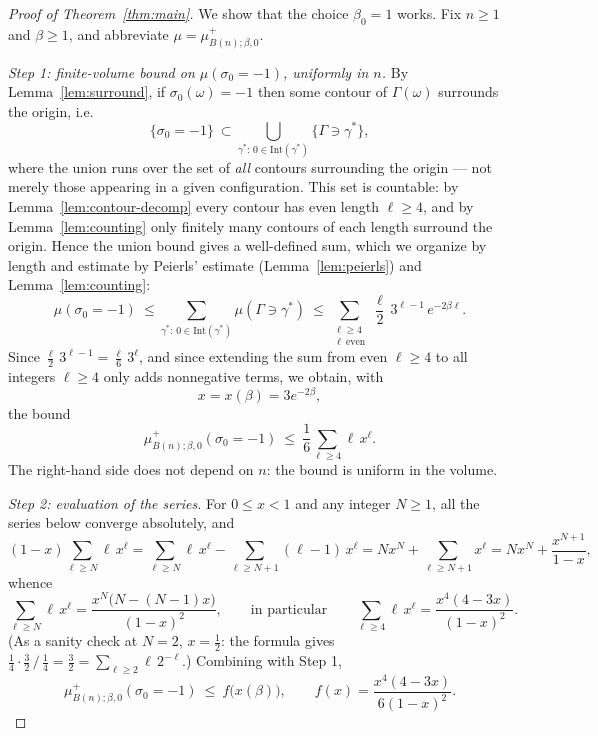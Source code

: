 \documentclass[11pt]{article}
\theoremstyle{plain}
\theoremstyle{definition}
\theoremstyle{remark}
\newcommand{\sg}{\sigma}
\newcommand{\Intr}{\mathrm{Int}}    %
\newcommand{\Gam}{\Gamma}           %
\begin{document}
\begin{proof}[Proof of Theorem~\ref{thm:main}]
We show that the choice $\beta_0=1$ works. Fix $n\ge1$ and $\beta\ge1$, and
abbreviate $\mu=\mu^{+}_{B(n);\beta,0}$.

\medskip\noindent
\emph{Step 1: finite-volume bound on $\mu(\sg_0=-1)$, uniformly in $n$.}
By Lemma~\ref{lem:surround}, if $\sg_0(\omega)=-1$ then some contour of
$\Gam(\omega)$ surrounds the origin, i.e.
\[
  \{\sg_0=-1\}\ \subset
  \bigcup_{\gamma^*:\,0\in\Intr(\gamma^*)}\{\Gam\ni\gamma^*\},
\]
where the union runs over the set of \emph{all} contours surrounding the
origin --- not merely those appearing in a given configuration. This set is
countable: by Lemma~\ref{lem:contour-decomp} every contour has even length
$\ell\ge4$, and by Lemma~\ref{lem:counting} only finitely many contours of
each length surround the origin. Hence the union bound gives a well-defined
sum, which we organize by length and estimate by Peierls' estimate
(Lemma~\ref{lem:peierls}) and Lemma~\ref{lem:counting}:
\[
  \mu(\sg_0=-1)
  \ \le \sum_{\gamma^*:\,0\in\Intr(\gamma^*)}\mu(\Gam\ni\gamma^*)
  \ \le \sum_{\substack{\ell\ge4\\ \ell\ \mathrm{even}}}
        \frac{\ell}{2}\,3^{\ell-1}\,e^{-2\beta\ell}.
\]
Since $\frac{\ell}{2}\,3^{\ell-1}=\frac{\ell}{6}\,3^{\ell}$, and since
extending the sum from even $\ell\ge4$ to all integers $\ell\ge4$ only adds
nonnegative terms, we obtain, with
\[
  x=x(\beta)=3e^{-2\beta},
\]
the bound
\[
  \mu^{+}_{B(n);\beta,0}(\sg_0=-1)\ \le\ \frac16\sum_{\ell\ge4}\ell\,x^{\ell}.
\]
The right-hand side does not depend on $n$: the bound is uniform in the
volume.

\medskip\noindent
\emph{Step 2: evaluation of the series.} For $0\le x<1$ and any integer
$N\ge1$, all the series below converge absolutely, and
\[
  (1-x)\sum_{\ell\ge N}\ell\,x^{\ell}
  =\sum_{\ell\ge N}\ell\,x^{\ell}-\sum_{\ell\ge N+1}(\ell-1)\,x^{\ell}
  =N x^{N}+\sum_{\ell\ge N+1}x^{\ell}
  =N x^{N}+\frac{x^{N+1}}{1-x},
\]
whence
\[
  \sum_{\ell\ge N}\ell\,x^{\ell}
  =\frac{x^{N}\big(N-(N-1)x\big)}{(1-x)^{2}},
  \qquad\text{in particular}\qquad
  \sum_{\ell\ge4}\ell\,x^{\ell}=\frac{x^{4}(4-3x)}{(1-x)^{2}}.
\]
(As a sanity check at $N=2$, $x=\tfrac12$: the formula gives
$\tfrac14\cdot\tfrac32\,/\,\tfrac14=\tfrac32=\sum_{\ell\ge2}\ell\,2^{-\ell}$.)
Combining with Step 1,
\[
  \mu^{+}_{B(n);\beta,0}(\sg_0=-1)\ \le\ f\big(x(\beta)\big),
  \qquad
  f(x)=\frac{x^{4}(4-3x)}{6(1-x)^{2}}.
\]


\end{proof}
\end{document}
